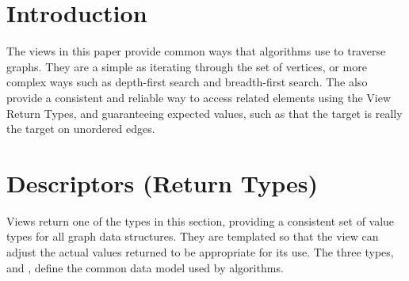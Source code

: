 
\clearpage

\section{Introduction}






%
%

The views in this paper provide common ways that algorithms use to traverse graphs. They are a simple as iterating 
through the set of vertices, or more complex ways such as depth-first search and breadth-first search. The also 
provide a consistent and reliable way to access related elements using the View Return Types, and guaranteeing expected 
values, such as that the target is really the target on unordered edges.

\section{Descriptors (Return Types)}
Views return one of the types in this section, providing a consistent set of value types for all graph data structures. 
They are templated so that the view can adjust the actual values returned to be appropriate for its use. The three types, 
 and , define the common data model used by algorithms.

